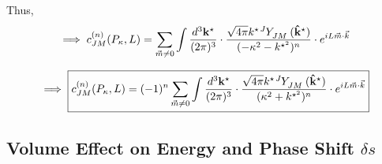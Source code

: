 \documentclass{article}
\begin{document}
Thus, 
\begin{align*}
  \implies c_{JM}^{(n)}(P_{\kappa}, L) &= \sum_{\vec{m} \neq 0} \int \frac{d^3 \mathbf{k}^{\star}}{(2\pi)^3} \cdot \frac{\sqrt{4\pi} k^{\star} \tensor[^J]{Y}{_{JM}} (\mathbf{\hat{k}}^{\star}) }{(-\kappa^2 - k^{\star^{2}})^n } \cdot e^{i L \vec{m} \cdot \vec{k}} \\ 
\end{align*}

\[ \implies \boxed{c_{JM}^{(n)}(P_{\kappa}, L) = (-1)^n \sum_{\vec{m} \neq 0} \int \frac{d^3 \mathbf{k}^{\star}}{(2\pi)^3} \cdot \frac{\sqrt{4\pi} k^{\star} \tensor[^J]{Y}{_{JM}} (\mathbf{\hat{k}}^{\star}) }{(\kappa^2 + k^{\star^{2}})^n } \cdot e^{i L \vec{m} \cdot \vec{k}} } \]



\vskip 1cm
\subsection{Volume Effect on Energy and Phase Shift $\delta s$}

\pagebreak
\printbibliography
\end{document}
